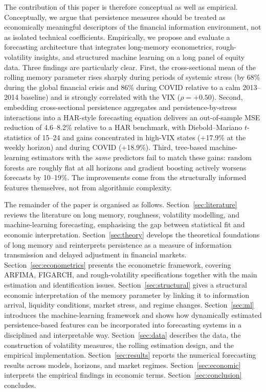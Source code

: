\documentclass[11pt,a4paper]{article}
\begin{document}
The contribution of this paper is therefore conceptual as well as
empirical. Conceptually, we argue that persistence measures should be
treated as economically meaningful descriptors of the financial information
environment, not as isolated technical coefficients. Empirically, we
propose and evaluate a forecasting architecture that integrates
long-memory econometrics, rough-volatility insights, and structured
machine learning on a long panel of equity data. Three findings are
particularly clear. First, the cross-sectional mean of the rolling memory
parameter rises sharply during periods of systemic stress (by 68\% during
the global financial crisis and 86\% during COVID relative to a calm
2013--2014 baseline) and is strongly correlated with the VIX
($\rho = +0.50$). Second, embedding cross-sectional persistence aggregates
and persistence-by-stress interactions into a HAR-style forecasting equation
delivers an out-of-sample MSE reduction of 4.6--8.2\% relative to a HAR
benchmark, with Diebold--Mariano $t$-statistics of 15--24 and gains
concentrated in high-VIX states (+17.9\% at the weekly horizon) and during
COVID (+18.9\%). Third, tree-based machine-learning estimators with the
\emph{same} predictors fail to match these gains: random forests are
roughly flat at all horizons and gradient boosting actively worsens
forecasts by 10--19\%. The improvements come from the structurally
informed features themselves, not from algorithmic complexity.

The remainder of the paper is organised as follows.
Section~\ref{sec:literature} reviews the literature on long memory,
roughness, volatility modelling, and machine-learning forecasting,
emphasising the gap between statistical fit and economic interpretation.
Section~\ref{sec:theory} develops the theoretical foundations of long
memory and reinterprets persistence as a measure of information
transmission and delayed adjustment in financial markets.
Section~\ref{sec:econometrics} presents the econometric framework,
covering ARFIMA, FIGARCH, and rough-volatility specifications together with
the main estimation and identification issues.
Section~\ref{sec:structural} gives a structural economic interpretation of
the memory parameter by linking it to information arrival, liquidity
conditions, market stress, and regime changes.
Section~\ref{sec:ml} introduces the machine-learning framework and shows
how dynamically estimated persistence-based features can be incorporated
into forecasting systems in a disciplined and interpretable way.
Section~\ref{sec:data} describes the data, the construction of volatility
measures, the rolling estimation design, and the empirical implementation.
Section~\ref{sec:results} reports the numerical forecasting results across
models, horizons, and market regimes.
Section~\ref{sec:economic} interprets the empirical findings in economic
terms.
Section~\ref{sec:conclusion} concludes.
\end{document}
